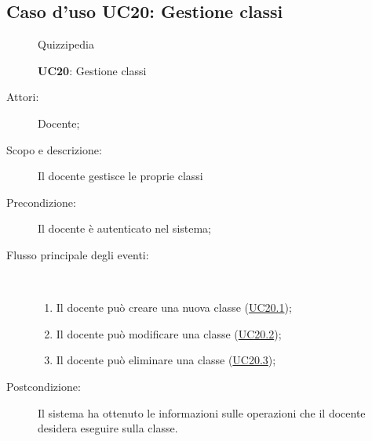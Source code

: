 \subsection{Caso d'uso UC20: Gestione classi}
	\begin{figure}[H]
		\centering
		\begin{resizedtikzpicture}{\textwidth}
		\begin{umlsystem}[x=0, fill=lightgray!20]{Quizzipedia}
		\end{umlsystem}
		\end{resizedtikzpicture}
		\caption{\textbf{UC20}: Gestione classi}
		\label{UC20}
	\end{figure}
\begin{description}
\item[Attori:] Docente;
\item[Scopo e descrizione:] Il docente gestisce le proprie classi
      \item[Precondizione:] Il docente è autenticato nel sistema;

        \item[Flusso principale degli eventi:] \ 
 \begin{enumerate}
          \item Il docente può creare una nuova classe (\hyperlink{UC20.1}{UC20.1});
          \item Il docente può modificare una classe (\hyperlink{UC20.2}{UC20.2});
          \item Il docente può eliminare una classe (\hyperlink{UC20.3}{UC20.3});

      \end{enumerate}
    \item[Postcondizione:] Il sistema ha ottenuto le informazioni sulle operazioni che il docente desidera eseguire sulla classe.
  \end{description}
\hypertarget{UC20.1}{}
